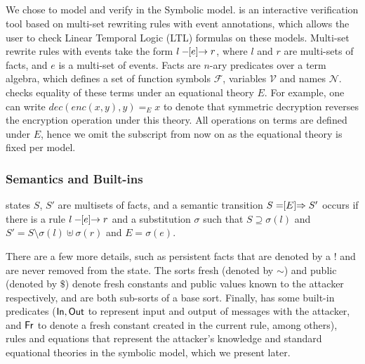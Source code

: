 \spacehack
\subsection{\mTamarin{}}
\label{sec:tamarin}
\fillhack
We chose \mTamarin{} to model and verify \mEdhoc{} in the Symbolic model.
%
\mTamarin{} is an interactive verification tool based on multi-set rewriting rules
with event annotations, which allows the user to check Linear Temporal Logic
(LTL) formulas on these models.
%
Multi-set rewrite rules with events take the form $ l \ifarrow[e] r $,
where $l$ and $r$ are multi-sets of facts, and $e$ is a multi-set of events.
Facts are $n$-ary predicates over a term algebra, which defines a set of function
symbols $\mathcal F$, variables $\mathcal V$ and names $\mathcal N$. \mTamarin{}
checks equality of these terms under an equational theory $E$. For example,
one can write $ dec(enc(x,y),y) =_E x $
to denote that symmetric decryption reverses the encryption operation under this theory.
All operations on terms are defined under $E$, hence we omit the
subscript from now on as the equational theory is fixed per model.

\spacehack
\subsubsection{Semantics and Built-ins} \phantom{} \mTamarin{} states
$S$, $S'$ are multisets of facts, and a semantic transition $S \semarrow[E] S'$
occurs if there is a rule $l \ifarrow[e] r$ and a substitution $\sigma$ such
that $S \supseteq \sigma(l)$ and $S' = S \setminus \sigma(l) \uplus \sigma(r)$
and $E = \sigma(e)$.

There are a few more details, such as persistent facts that are denoted by a $!$
and are never removed from the state.
%
The sorts fresh (denoted by $\sim$) and public (denoted by $\$$) denote fresh
constants and public values known to the attacker respectively, and are both
sub-sorts of a base sort.
%
Finally, \mTamarin{} has some built-in predicates ($\mathsf{In},
\mathsf{Out}$ to represent input and output of messages with the attacker,
and
$\mathsf{Fr}$ to denote a fresh constant created in the current rule, among
others), rules and equations that represent the attacker's knowledge
and standard equational theories in the symbolic model,
which we present later.

